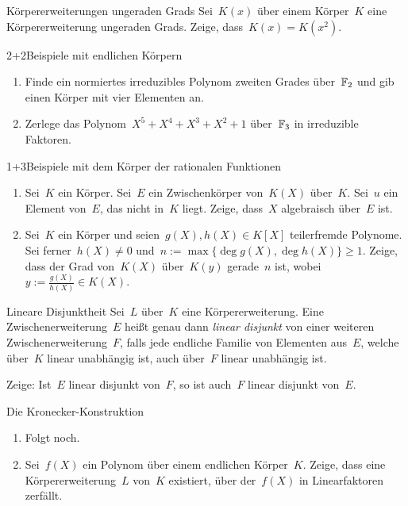 \documentclass{algblatt}
\begin{document}

\begin{aufgabe}{4}{Körpererweiterungen ungeraden Grads}
Sei~$K(x)$ über einem Körper~$K$ eine Körpererweiterung ungeraden Grads. Zeige,
dass~$K(x) = K(x^2)$.
\end{aufgabe}

\begin{aufgabe}{2+2}{Beispiele mit endlichen Körpern}
\begin{enumerate}
\item
Finde ein normiertes irreduzibles Polynom zweiten Grades über~$\mathbb{F}_2$ und gib
einen Körper mit vier Elementen an.
\item Zerlege das Polynom~$X^5 + X^4 + X^3 + X^2 + 1$ über~$\mathbb{F}_3$ in
irreduzible Faktoren.
\end{enumerate}
\end{aufgabe}

\begin{aufgabe}{1+3}{Beispiele mit dem Körper der rationalen Funktionen}
\begin{enumerate}
\item Sei~$K$ ein Körper. Sei~$E$ ein Zwischenkörper von~$K(X)$ über~$K$.
Sei~$u$ ein Element von~$E$, das nicht in~$K$ liegt. Zeige, dass~$X$
algebraisch über~$E$ ist.
\item Sei~$K$ ein Körper und seien~$g(X), h(X) \in K[X]$ teilerfremde Polynome.
Sei ferner~$h(X) \neq 0$ und~$n := \max\{ \deg g(X), \deg h(X) \} \geq 1$.
Zeige, dass der Grad von~$K(X)$ über~$K(y)$ gerade~$n$ ist, wobei~$y :=
\tfrac{g(X)}{h(X)} \in K(X)$.
\end{enumerate}
\end{aufgabe}

\begin{aufgabe}{4}{Lineare Disjunktheit}
Sei~$L$ über~$K$ eine Körpererweiterung. Eine Zwischenerweiterung~$E$ heißt
genau dann \emph{linear disjunkt} von einer weiteren Zwischenerweiterung~$F$,
falls jede endliche Familie von Elementen aus~$E$, welche über~$K$ linear
unabhängig ist, auch über~$F$ linear unabhängig ist.

Zeige: Ist~$E$ linear disjunkt von~$F$, so ist auch~$F$ linear disjunkt von~$E$.
\end{aufgabe}

\begin{aufgabe}{4}{Die Kronecker-Konstruktion}
\begin{enumerate}
\item Folgt noch.
\item Sei~$f(X)$ ein Polynom über einem endlichen Körper~$K$. Zeige, dass eine
Kör\-per\-erwei\-te\-rung~$L$ von~$K$ existiert, über der~$f(X)$ in Linearfaktoren
zerfällt.
\end{enumerate}
\end{aufgabe}
\end{document}
